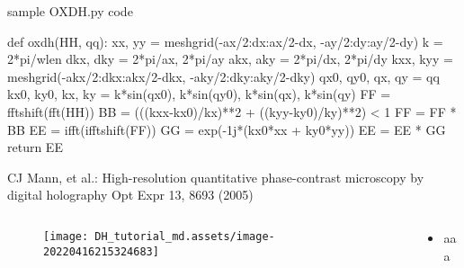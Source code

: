 \documentclass[t, aspectratio=169]{beamer}
\begin{document}
\begin{frame}[fragile]{sample OXDH.py code}
	\begin{semiverbatim}
def oxdh(HH, qq):
    xx, yy = meshgrid(-ax/2:dx:ax/2-dx, -ay/2:dy:ay/2-dy)
    k = 2*pi/wlen
    dkx, dky = 2*pi/ax, 2*pi/ay
    akx, aky = 2*pi/dx, 2*pi/dy
    kxx, kyy = meshgrid(-akx/2:dkx:akx/2-dkx, -aky/2:dky:aky/2-dky)
    qx0, qy0, qx, qy = qq	%
    kx0, ky0, kx, ky = k*sin(qx0), k*sin(qy0), k*sin(qx), k*sin(qy)   
    FF = fftshift(fft(HH))    
    BB = (((kxx-kx0)/kx)**2 + ((kyy-ky0)/ky)**2) < 1
    FF = FF * BB
    EE = ifft(ifftshift(FF)) 
    GG = exp(-1j*(kx0*xx + ky0*yy))
    EE = EE * GG    
    return EE
	\end{semiverbatim}
\end{frame}


\begin{frame}{CJ Mann, et al.: High-resolution quantitative phase-contrast microscopy by digital holography}
	\vspace{-3 mm}
	\small Opt Expr 13, 8693 (2005)
	\begin{columns}
		\begin{column}{.6\textwidth}
			\begin{figure}
				\texttt{[image: DH\_tutorial\_md.assets/image-20220416215324683]}
			\end{figure}
		\end{column}
		\begin{column}{.4\textwidth}
			\begin{itemize}
				\item aaa
			\end{itemize}
		\end{column}
	\end{columns}
\end{frame}


\end{document}
